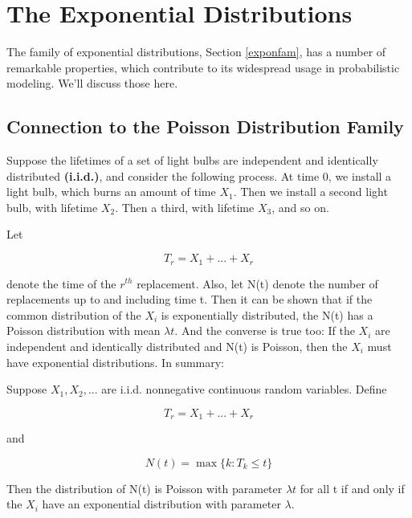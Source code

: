 \chapter{The Exponential Distributions}
\label{chap:expondistr}

The family of exponential distributions, Section \ref{exponfam}, has a
number of remarkable properties, which contribute to its widespread
usage in probabilistic modeling.  We'll discuss those here.

\section{Connection to the Poisson Distribution Family}
\label{connpoi}

Suppose the lifetimes of a set of light bulbs are independent and
identically distributed {\bf (i.i.d.)}, and consider the following
process.  At time 0, we install a light bulb, which burns an amount of
time $X_1$.  Then we install a second light bulb, with lifetime $X_2$.
Then a third, with lifetime $X_3$, and so on.  

Let 

\begin{equation}
\label{ti}
T_r = X_1+...+X_r
\end{equation}

denote the time of the $r^{th}$ replacement.  Also, let N(t) denote the
number of replacements up to and including time t.  Then it can be shown
that if the common distribution of the $X_i$ is exponentially
distributed, the N(t) has a Poisson distribution with mean $\lambda t$.
And the converse is true too:  If the $X_i$ are independent and
identically distributed and N(t) is Poisson, then the $X_i$ must have
exponential distributions.  In summary:

\begin{theorem}
Suppose $X_1, X_2, ...$ are i.i.d. nonnegative continuous random
variables.  Define

\begin{equation}
T_r = X_1+...+X_r
\end{equation}

and 

\begin{equation}
N(t) = \max\{k: T_k \leq t\}
\end{equation}

Then the distribution of N(t) is Poisson with parameter $\lambda t$ for
all t if and only if the $X_i$ have an exponential distribution with
parameter $\lambda$.

\end{theorem}

